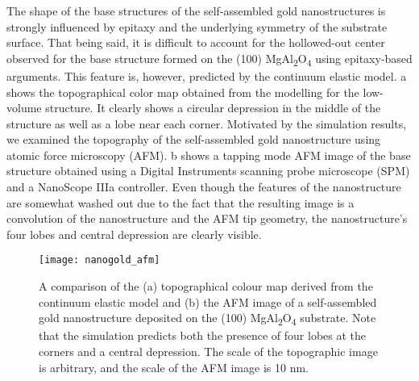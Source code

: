 The shape of the base structures of the self-assembled gold nanostructures is strongly influenced by epitaxy and the underlying symmetry of the substrate surface.
That being said, it is difficult to account for the hollowed-out center observed for the base structure formed on the (100) MgAl\textsubscript{2}O\textsubscript{4} using epitaxy-based arguments.
This feature is, however, predicted by the continuum elastic model.
a shows the topographical color map obtained from the modelling for the low-volume structure.
It clearly shows a circular depression in the middle of the structure as well as a lobe near each corner.
Motivated by the simulation results, we examined the topography of the self-assembled gold nanostructure using atomic force microscopy (AFM).
b shows a tapping mode AFM image of the base structure obtained using a Digital Instruments scanning probe microscope (SPM) and a NanoScope IIIa controller.
Even though the features of the nanostructure are somewhat washed out due to the fact that the resulting image is a convolution of the nanostructure and the AFM tip geometry, the nanostructure's four lobes and central depression are clearly visible.
\begin{figure}
 \centering \texttt{[image: nanogold\_afm]}
 \caption[Comparison of AFM and simulated gold nanostructure topography]{\label{fig:nanogold_afm}A comparison of the (a) topographical colour map derived from the continuum elastic model and (b) the AFM image of a self-assembled gold nanostructure deposited on the (100) MgAl\textsubscript{2}O\textsubscript{4} substrate.
  Note that the simulation predicts both the presence of four lobes at the corners and a central depression.
  The scale of the topographic image is arbitrary, and the scale of the AFM image is 10 nm.}
\end{figure}

